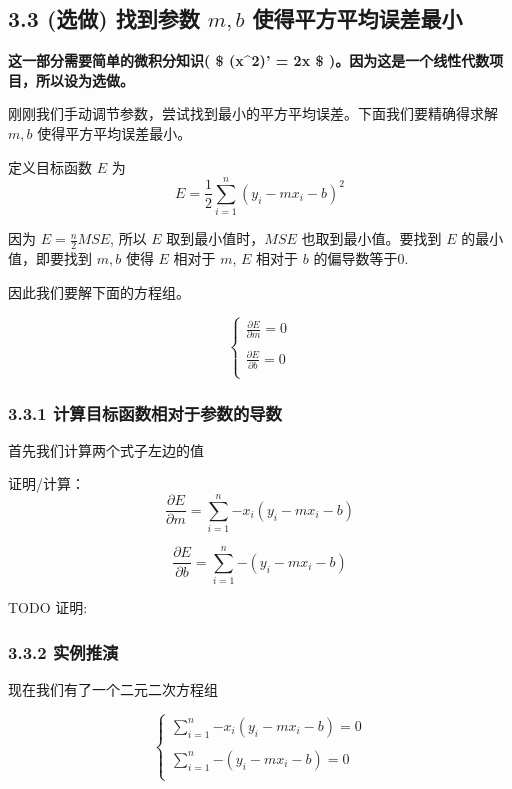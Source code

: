\documentclass[11pt]{article}
\begin{document}
    \subsection{\texorpdfstring{3.3 (选做) 找到参数 \(m, b\)
使得平方平均误差最小}{3.3 (选做) 找到参数 m, b 使得平方平均误差最小}}\label{ux9009ux505a-ux627eux5230ux53c2ux6570-m-b-ux4f7fux5f97ux5e73ux65b9ux5e73ux5747ux8befux5deeux6700ux5c0f}

\textbf{这一部分需要简单的微积分知识( \$ (x\^{}2)' = 2x \$
)。因为这是一个线性代数项目，所以设为选做。}

刚刚我们手动调节参数，尝试找到最小的平方平均误差。下面我们要精确得求解
\(m, b\) 使得平方平均误差最小。

定义目标函数 \(E\) 为 \[
E = \frac{1}{2}\sum_{i=1}^{n}{(y_i - mx_i - b)^2}
\]

因为 \(E = \frac{n}{2}MSE\), 所以 \(E\) 取到最小值时，\(MSE\)
也取到最小值。要找到 \(E\) 的最小值，即要找到 \(m, b\) 使得 \(E\) 相对于
\(m\), \(E\) 相对于 \(b\) 的偏导数等于0.

因此我们要解下面的方程组。

\[
\begin{cases}
\displaystyle
\frac{\partial E}{\partial m} =0 \\
\\
\displaystyle
\frac{\partial E}{\partial b} =0 \\
\end{cases}
\]

\subsubsection{3.3.1
计算目标函数相对于参数的导数}\label{ux8ba1ux7b97ux76eeux6807ux51fdux6570ux76f8ux5bf9ux4e8eux53c2ux6570ux7684ux5bfcux6570}

首先我们计算两个式子左边的值

证明/计算： \[
\frac{\partial E}{\partial m} = \sum_{i=1}^{n}{-x_i(y_i - mx_i - b)}
\]

\[
\frac{\partial E}{\partial b} = \sum_{i=1}^{n}{-(y_i - mx_i - b)}
\]

    TODO 证明:

    \subsubsection{3.3.2 实例推演}\label{ux5b9eux4f8bux63a8ux6f14}

现在我们有了一个二元二次方程组

\[
\begin{cases}
\displaystyle
\sum_{i=1}^{n}{-x_i(y_i - mx_i - b)} =0 \\
\\
\displaystyle
\sum_{i=1}^{n}{-(y_i - mx_i - b)} =0 \\
\end{cases}
\]
\end{document}
